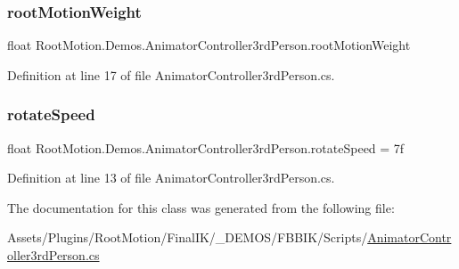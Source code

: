 \subsubsection{\texorpdfstring{root\+Motion\+Weight}{rootMotionWeight}}
{\footnotesize\ttfamily float Root\+Motion.\+Demos.\+Animator\+Controller3rd\+Person.\+root\+Motion\+Weight}



Definition at line 17 of file Animator\+Controller3rd\+Person.\+cs.

\mbox{\label{class_root_motion_1_1_demos_1_1_animator_controller3rd_person_a63931bbe5b680337d739176fdc5cb449}} 
\subsubsection{\texorpdfstring{rotate\+Speed}{rotateSpeed}}
{\footnotesize\ttfamily float Root\+Motion.\+Demos.\+Animator\+Controller3rd\+Person.\+rotate\+Speed = 7f}



Definition at line 13 of file Animator\+Controller3rd\+Person.\+cs.



The documentation for this class was generated from the following file\+:\begin{DoxyCompactItemize}
\item 
Assets/\+Plugins/\+Root\+Motion/\+Final\+I\+K/\+\_\+\+D\+E\+M\+O\+S/\+F\+B\+B\+I\+K/\+Scripts/\mbox{\hyperlink{_animator_controller3rd_person_8cs}{Animator\+Controller3rd\+Person.\+cs}}\end{DoxyCompactItemize}
